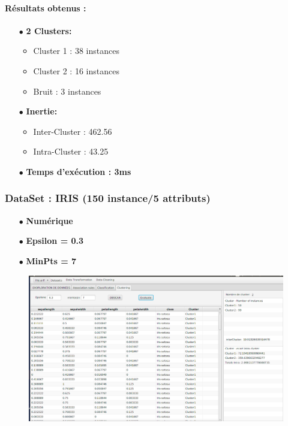 \documentclass[12pt,a4paper,oneside]{book}
\begin{document}
\paragraph{Résultats obtenus :}
\begin{itemize}
	\item[$\bullet$] \textbf{2 Clusters: }
	\begin{itemize}
		\item Cluster 1 : 38 instances
		\item Cluster 2 : 16 instances
		\item Bruit : 3 instances
	\end{itemize}
	\item[$\bullet$] \textbf{Inertie:}
	\begin{itemize}
		\item Inter-Cluster : 462.56
		\item Intra-Cluster : 43.25
	\end{itemize}
	\item[$\bullet$] \textbf{Temps d'exécution : 3ms}
\end{itemize}


\subsubsection*{DataSet : IRIS (150 instance/5 attributs)}
\begin{itemize}
	\item[$\bullet$] \textbf{Numérique}
	\item[$\bullet$] \textbf{Epsilon = 0.3}
	\item[$\bullet$] \textbf{MinPts = 7}
\end{itemize}

\begin{figure}[H]
	\centering
	\includegraphics[scale=0.38]{images/dbscan2-2.png}
	\label{labelname}%
\end{figure}
\end{document}
